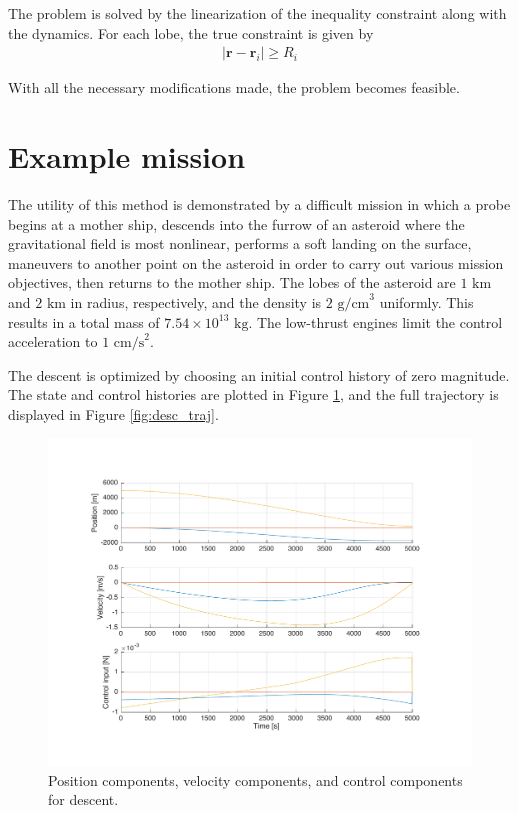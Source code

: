 \documentclass{article}
\begin{document}
\begin{multicols}{2}
The problem is solved by the linearization of the inequality constraint along with the dynamics. For each lobe, the true constraint is given by
\begin{align*} 
	|\mathbf{r} - \mathbf{r}_{i}| \ge R_{i}
\end{align*}

With all the necessary modifications made, the problem becomes feasible.

\section*{Example mission}
The utility of this method is demonstrated by a difficult mission in which a probe begins at a mother ship, descends into the furrow of an asteroid where the gravitational field is most nonlinear, performs a soft landing on the surface, maneuvers to another point on the asteroid in order to carry out various mission objectives, then returns to the mother ship. The lobes of the asteroid are $1\text{ km}$ and $2\text{ km}$ in radius, respectively, and the density is $2\text{ g/cm}^{3}$ uniformly. This results in a total mass of $7.54\times10^{13}\text{ kg}$. The low-thrust engines limit the control acceleration to $1\text{ cm/s}^{2}$.

The descent is optimized by choosing an initial control history of zero magnitude. The state and control histories are plotted in Figure \ref{fig:desc_plots}, and the full trajectory is displayed in Figure \ref{fig:desc_traj}.

\begin{figure}[H]
	\center
	\includegraphics[width=0.85\linewidth]{figs/desc_plots}
	\caption{Position components, velocity components, and control components for descent.}
	\label{fig:desc_plots}
\end{figure}


\end{multicols}
\end{document}
